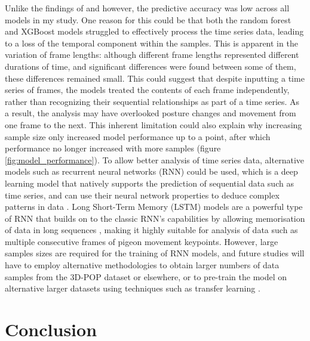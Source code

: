 \documentclass[11pt, letterpaper]{article} %
\begin{document}
\noindent Unlike the findings of \citet{bergen_review_2023} and \citet{yu_evaluation_2021} however, the predictive accuracy was low across all models in my study. One reason for this could be that both the random forest and XGBoost models struggled to effectively process the time series data, leading to a loss of the temporal component within the samples. This is apparent in the variation of frame lengths: although different frame lengths represented different durations of time, and significant differences were found between some of them, these differences remained small. This could suggest that despite inputting a time series of frames, the models treated the contents of each frame independently, rather than recognizing their sequential relationships as part of a time series. As a result, the analysis may have overlooked posture changes and movement from one frame to the next. This inherent limitation could also explain why increasing sample size only increased model performance up to a point, after which performance no longer increased with more samples (figure \ref{fig:model_performance}). To allow better analysis of time series data, alternative models such as recurrent neural networks (RNN) could be used, which is a deep learning model that natively supports the prediction of sequential data such as time series, and can use their neural network properties to deduce complex patterns in data \citep{timeseries_book}. Long Short-Term Memory (LSTM) models are a powerful type of RNN that builds on to the classic RNN's capabilities by allowing memorisation of data in long sequences \citep{timeseries_book}, making it highly suitable for analysis of data such as multiple consecutive frames of pigeon movement keypoints. However, large samples sizes are required for the training of RNN models, and future studies will have to employ alternative methodologies to obtain larger numbers of data samples from the 3D-POP dataset or elsewhere, or to pre-train the model on alternative larger datasets using techniques such as transfer learning \citep{mathis_deeplearning_2020, sagheer_deep_2021}.







\section{Conclusion}
\end{document}
